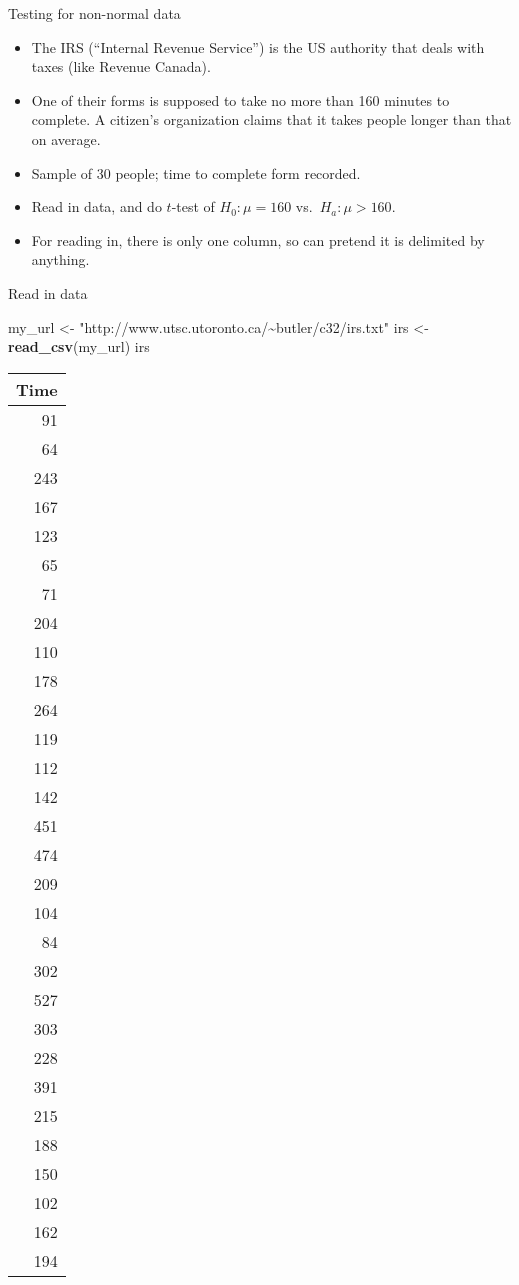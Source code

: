 \documentclass[
  ignorenonframetext,
]{beamer}
\newenvironment{Shaded}{\begin{snugshade}}{\end{snugshade}}
\newcommand{\KeywordTok}[1]{\textcolor[rgb]{0.13,0.29,0.53}{\textbf{#1}}}
\newcommand{\NormalTok}[1]{#1}
\newcommand{\StringTok}[1]{\textcolor[rgb]{0.31,0.60,0.02}{#1}}
\providecommand{\tightlist}{%
  \setlength{\itemsep}{0pt}\setlength{\parskip}{0pt}}
\begin{document}
\begin{frame}{Testing for non-normal data}
\protect\hypertarget{testing-for-non-normal-data}{}
\begin{itemize}
\tightlist
\item
  The IRS (``Internal Revenue Service'') is the US authority that deals
  with taxes (like Revenue Canada).
\item
  One of their forms is supposed to take no more than 160 minutes to
  complete. A citizen's organization claims that it takes people longer
  than that on average.
\item
  Sample of 30 people; time to complete form recorded.
\item
  Read in data, and do \(t\)-test of \(H_0 : \mu = 160\)
  vs.~\(H_a : \mu > 160\).
\item
  For reading in, there is only one column, so can pretend it is
  delimited by anything.
\end{itemize}
\end{frame}

\begin{frame}[fragile]{Read in data}
\protect\hypertarget{read-in-data}{}
\begin{Shaded}
\begin{Highlighting}[]
\NormalTok{my\_url \textless{}{-}}\StringTok{ "http://www.utsc.utoronto.ca/\textasciitilde{}butler/c32/irs.txt"}
\NormalTok{irs \textless{}{-}}\StringTok{ }\KeywordTok{read\_csv}\NormalTok{(my\_url)}
\NormalTok{irs}
\end{Highlighting}
\end{Shaded}

\begin{longtable}[]{@{}r@{}}
\toprule
Time\tabularnewline
\midrule
\endhead
91\tabularnewline
64\tabularnewline
243\tabularnewline
167\tabularnewline
123\tabularnewline
65\tabularnewline
71\tabularnewline
204\tabularnewline
110\tabularnewline
178\tabularnewline
264\tabularnewline
119\tabularnewline
112\tabularnewline
142\tabularnewline
451\tabularnewline
474\tabularnewline
209\tabularnewline
104\tabularnewline
84\tabularnewline
302\tabularnewline
527\tabularnewline
303\tabularnewline
228\tabularnewline
391\tabularnewline
215\tabularnewline
188\tabularnewline
150\tabularnewline
102\tabularnewline
162\tabularnewline
194\tabularnewline
\bottomrule
\end{longtable}
\end{frame}
\end{document}
